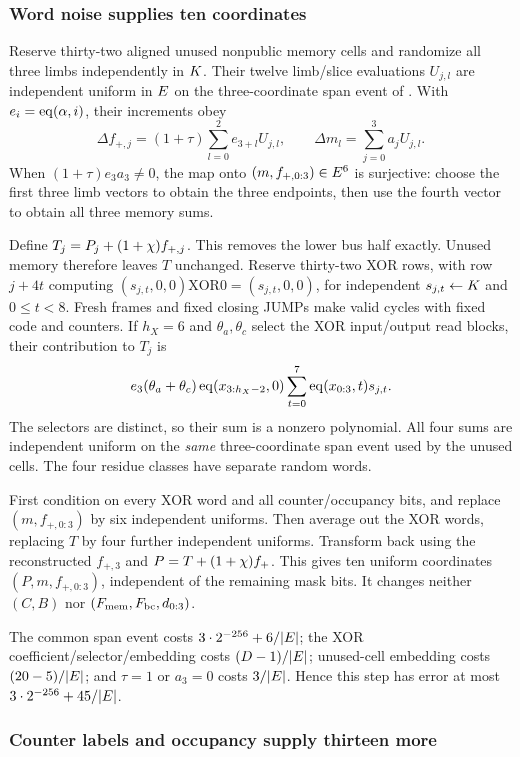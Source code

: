 \subsubsection{Word noise supplies ten coordinates}

Reserve thirty-two aligned unused nonpublic memory cells and randomize all three limbs independently in $K$. Their twelve limb/slice evaluations $U_{j,l}$ are independent uniform in $E$ on the three-coordinate span event of . With $e_i=\operatorname{eq}(\alpha,i)$, their increments obey
\[
 \Delta f_{+,j}=(1+\tau)\sum_{l=0}^2 e_{3+l}U_{j,l},
 \qquad \Delta m_l=\sum_{j=0}^3a_jU_{j,l}.
\]
When $(1+\tau)e_3a_3\ne0$, the map onto $(m,f_{+,0:3})\in E^6$ is surjective: choose the first three limb vectors to obtain the three endpoints, then use the fourth vector to obtain all three memory sums.

Define $T_j=P_j+(1+\chi)f_{+,j}$. This removes the lower bus half exactly. Unused memory therefore leaves $T$ unchanged. Reserve thirty-two XOR rows, with row $j+4t$ computing $(s_{j,t},0,0)\mathbin{\mathrm{XOR}}0=(s_{j,t},0,0)$, for independent $s_{j,t}\gets K$ and $0\le t<8$. Fresh frames and fixed closing JUMPs make valid cycles with fixed code and counters. If $h_X=6$ and $\theta_a,\theta_c$ select the XOR input/output read blocks, their contribution to $T_j$ is
\[
 e_3(\theta_a+\theta_c)
 \operatorname{eq}(x_{3:h_X-2},0)
 \sum_{t=0}^7\operatorname{eq}(x_{0:3},t)s_{j,t}.
\]
The selectors are distinct, so their sum is a nonzero polynomial. All four sums are independent uniform on the \emph{same} three-coordinate span event used by the unused cells. The four residue classes have separate random words.

First condition on every XOR word and all counter/occupancy bits, and replace $(m,f_{+,0:3})$ by six independent uniforms. Then average out the XOR words, replacing $T$ by four further independent uniforms. Transform back using the reconstructed $f_{+,3}$ and $P=T+(1+\chi)f_+$. This gives ten uniform coordinates $(P,m,f_{+,0:3})$, independent of the remaining mask bits. It changes neither $(C,B)$ nor $(F_{\rm mem},F_{\rm bc},d_{0:3})$.

The common span event costs $3\cdot2^{-256}+6/|E|$; the XOR coefficient/selector/embedding costs $(D-1)/|E|$; unused-cell embedding costs $(20-5)/|E|$; and $\tau=1$ or $a_3=0$ costs $3/|E|$. Hence this step has error at most $3\cdot2^{-256}+45/|E|$.

\subsubsection{Counter labels and occupancy supply thirteen more}

